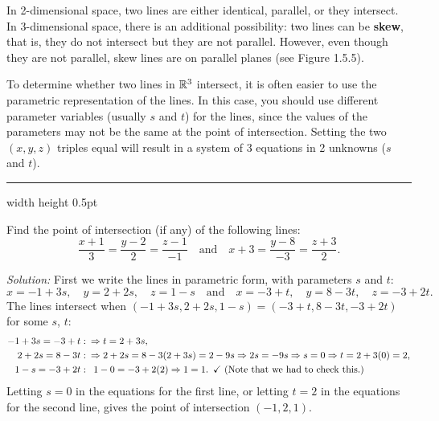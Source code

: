 \piccaption[]{}
In 2-dimensional space, two lines are either identical, parallel, or they intersect. In 3-dimensional space, there is an
additional possibility: two lines can be \textbf{skew}, that is, they do not intersect but they are not
parallel. 
However, even though they are not parallel, skew lines are on parallel planes (see Figure 1.5.5).

To determine
whether two lines in $\mathbb{R}^{3}$ intersect, it is often easier to use the parametric representation of the lines. 
In this case, you should use different parameter variables (usually $s$ and $t$) for the lines, since the values of the
parameters may not be the same at the point of intersection. 
Setting the two $(x,y,z)$ triples equal will result in a
system of 3 equations in 2 unknowns ($s$ and $t$).

\vspace{2mm}
\hrule width \textwidth height 0.5pt
\begin{exmp}
 Find the point of intersection (if any) of the following lines:
 \begin{displaymath}
  \frac{x + 1}{3} = \frac{y - 2}{2} = \frac{z - 1}{-1} \quad \text{and} \quad
  x + 3 = \frac{y - 8}{-3} = \frac{z + 3}{2}.
 \end{displaymath}
 \par\noindent\emph{Solution:} First we write the lines in parametric form, with parameters $s$ and $t$:
 \begin{displaymath}
  x = -1 + 3s,\quad y = 2 + 2s,\quad z = 1 - s \quad \text{and} \quad x = -3 + t,\quad y = 8 - 3t,\quad z = -3 + 2t.
 \end{displaymath}
 The lines intersect when $(-1 + 3s,2 + 2s,1 - s) = (-3 + t,8 - 3t,-3 + 2t)$ for some $s$, $t$:
 \begin{align*}
  -1 + 3s = -3 + t &: \enskip\Rightarrow t = 2 + 3s,\\
  2 + 2s = 8 - 3t &: \enskip\Rightarrow 2 + 2s = 8 - 3(2 + 3s) = 2 - 9s \Rightarrow 2s = -9s \Rightarrow s = 0
  \Rightarrow t = 2 + 3(0) = 2,\\
  1 - s = -3 + 2t &: \enskip1 - 0 = -3 + 2(2) \Rightarrow 1 = 1. \enskip\checkmark \text{~(Note that we had to check
  this.)}
 \end{align*}
 Letting $s = 0$ in the equations for the first line, or letting $t = 2$ in the equations for the second line,
 gives the point of intersection $(-1,2,1)$.
\end{exmp}

